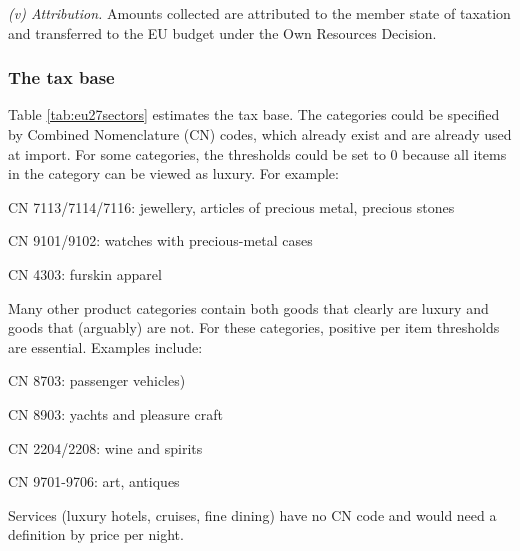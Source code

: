 \documentclass{article}
\begin{document}
\emph{(v) Attribution.} Amounts collected are attributed to the member state of taxation and transferred to the EU budget under the Own Resources Decision.

\subsubsection{The tax base}\label{sec:thresholds} %

Table \ref{tab:eu27sectors} estimates the tax base. 
The categories could be specified by Combined Nomenclature (CN) codes, which already exist and are already used at import. For some categories, the thresholds could be set to 0 because all items in the category can be viewed as luxury. For example:

CN 7113/7114/7116: jewellery, articles of precious metal, precious stones

CN 9101/9102: watches with precious-metal cases

CN 4303: furskin apparel

Many other product categories contain both goods that clearly are luxury and goods that (arguably) are not. For these categories, positive per item thresholds are essential. Examples include:

CN 8703: passenger vehicles)

CN 8903: yachts and pleasure craft

CN 2204/2208: wine and spirits

CN 9701-9706: art, antiques

Services (luxury hotels, cruises, fine dining) have no CN code and would need a definition by price per night.
\end{document}
